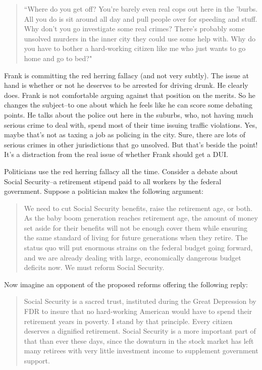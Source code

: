 \begin{quote}``Where do you get off? You're barely even real cops out here in the 'burbs. All you do is
sit around all day and pull people over for speeding and stuff. Why don't you go investigate
some real crimes? There's probably some unsolved murders in the inner city they could
use some help with. Why do you have to bother a hard-working citizen like me who just
wants to go home and go to bed?"
\end{quote}

Frank is committing the red herring fallacy (and not very subtly). The issue at hand is whether or
not he deserves to be arrested for driving drunk. He clearly does. Frank is not comfortable arguing
against that position on the merits. So he changes the subject--to one about which he feels like he
can score some debating points. He talks about the police out here in the suburbs, who, not having
much serious crime to deal with, spend most of their time issuing traffic violations. Yes, maybe
that's not as taxing a job as policing in the city. Sure, there are lots of serious crimes in other
jurisdictions that go unsolved. But that's beside the point! It's a distraction from the real issue of
whether Frank should get a DUI.

Politicians use the red herring fallacy all the time. Consider a debate about Social Security--a
retirement stipend paid to all workers by the federal government. Suppose a politician makes the
following argument:

\begin{quote}
We need to cut Social Security benefits, raise the retirement age, or both. As the baby boom
generation reaches retirement age, the amount of money set aside for their benefits will not
be enough cover them while ensuring the same standard of living for future generations
when they retire. The status quo will put enormous strains on the federal budget going
forward, and we are already dealing with large, economically dangerous budget deficits
now. We must reform Social Security.
\end{quote}

Now imagine an opponent of the proposed reforms offering the following reply:

\begin{quote}
Social Security is a sacred trust, instituted during the Great Depression by FDR to insure
that no hard-working American would have to spend their retirement years in poverty. I
stand by that principle. Every citizen deserves a dignified retirement. Social Security is a
more important part of that than ever these days, since the downturn in the stock market
has left many retirees with very little investment income to supplement government
support.\end{quote}


